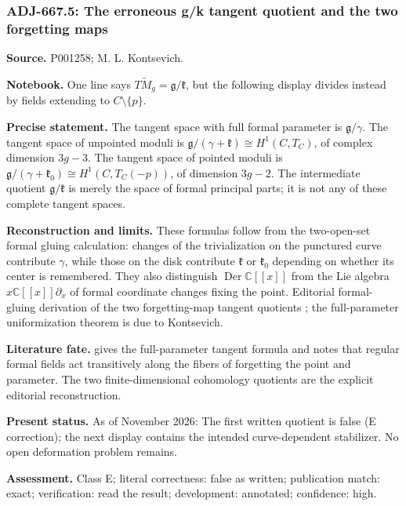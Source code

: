 \subsubsection{ADJ-667.5: The erroneous g/k tangent quotient and the two forgetting maps}
\noindent\textbf{Source.} P001258; M. L. Kontsevich.\par
\noindent\textbf{Notebook.} One line says \(T\widetilde M_g=\mathfrak g/\mathfrak k\), but the following display divides instead by fields extending to \(C\setminus\{p\}\).\par

\noindent\textbf{Precise statement.} The tangent space with full formal parameter is \(\mathfrak g/\gamma\). The tangent space of unpointed moduli is \(\mathfrak g/(\gamma+\mathfrak k)\cong H^1(C,T_C)\), of complex dimension \(3g-3\). The tangent space of pointed moduli is \(\mathfrak g/(\gamma+\mathfrak k_0)\cong H^1(C,T_C(-p))\), of dimension \(3g-2\). The intermediate quotient \(\mathfrak g/\mathfrak k\) is merely the space of formal principal parts; it is not any of these complete tangent spaces.\par

\noindent\textbf{Reconstruction and limits.} These formulas follow from the two-open-set formal gluing calculation: changes of the trivialization on the punctured curve contribute \(\gamma\), while those on the disk contribute \(\mathfrak k\) or \(\mathfrak k_0\) depending on whether its center is remembered. They also distinguish \(\operatorname{Der}\mathbb C[[x]]\) from the Lie algebra \(x\mathbb C[[x]]\partial_x\) of formal coordinate changes fixing the point. Editorial formal-gluing derivation of the two forgetting-map tangent quotients \ours; the full-parameter uniformization theorem is due to Kontsevich.\par

\noindent\textbf{Literature fate.} \citet[\S1]{kontsevich1987virasoro} gives the full-parameter tangent formula and notes that regular formal fields act transitively along the fibers of forgetting the point and parameter. The two finite-dimensional cohomology quotients are the explicit editorial reconstruction.\par

\noindent\textbf{Present status.} As of November 2026: The first written quotient is false (E correction); the next display contains the intended curve-dependent stabilizer. No open deformation problem remains.\par

\noindent\textbf{Assessment.} Class E; literal correctness: false as written; publication match: exact; verification: read the result; development: annotated; confidence: high.\par

